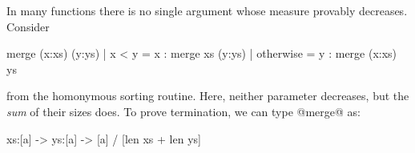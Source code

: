 In many functions there is no single argument 
whose measure provably decreases. Consider
%
\begin{code}
  merge (x:xs) (y:ys)
    | x < y     = x : merge xs (y:ys)
    | otherwise = y : merge (x:xs) ys
\end{code}
%
from the homonymous sorting routine. Here, neither
parameter decreases, but the \emph{sum} of their 
sizes does. To prove termination, we can type @merge@ as:
%
\begin{code}
  xs:[a] -> ys:[a] -> [a] / [len xs + len ys]
\end{code}



